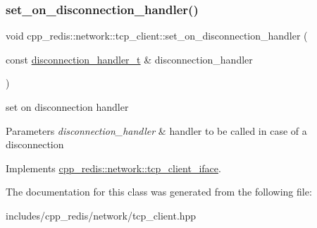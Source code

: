 \subsubsection{\texorpdfstring{set\+\_\+on\+\_\+disconnection\+\_\+handler()}{set\_on\_disconnection\_handler()}}
{\footnotesize\ttfamily void cpp\+\_\+redis\+::network\+::tcp\+\_\+client\+::set\+\_\+on\+\_\+disconnection\+\_\+handler (\begin{DoxyParamCaption}\item[{const \mbox{\hyperlink{classcpp__redis_1_1network_1_1tcp__client__iface_a9a7d5942205db8be03da581a848b8ec0}{disconnection\+\_\+handler\+\_\+t}} \&}]{disconnection\+\_\+handler }\end{DoxyParamCaption})\hspace{0.3cm}{\ttfamily [virtual]}}

set on disconnection handler


\begin{DoxyParams}{Parameters}
{\em disconnection\+\_\+handler} & handler to be called in case of a disconnection \\
\hline
\end{DoxyParams}


Implements \mbox{\hyperlink{classcpp__redis_1_1network_1_1tcp__client__iface_acecf3b75c3849071d82478bc7a8c97a8}{cpp\+\_\+redis\+::network\+::tcp\+\_\+client\+\_\+iface}}.



The documentation for this class was generated from the following file\+:\begin{DoxyCompactItemize}
\item 
includes/cpp\+\_\+redis/network/tcp\+\_\+client.\+hpp\end{DoxyCompactItemize}
